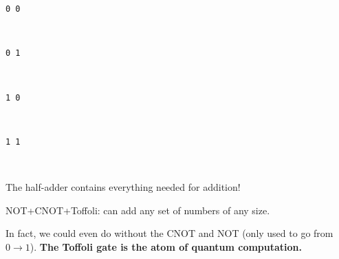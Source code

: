 \documentclass[11pt]{article}
\begin{document}
    \begin{Verbatim}[commandchars=\\\{\}]
0 0
    \end{Verbatim}

    \begin{center}
    \end{center}
    { \hspace*{\fill} \\}
    
    \begin{Verbatim}[commandchars=\\\{\}]
0 1
    \end{Verbatim}

    \begin{center}
    \end{center}
    { \hspace*{\fill} \\}
    
    \begin{Verbatim}[commandchars=\\\{\}]
1 0
    \end{Verbatim}

    \begin{center}
    \end{center}
    { \hspace*{\fill} \\}
    
    \begin{Verbatim}[commandchars=\\\{\}]
1 1
    \end{Verbatim}

    \begin{center}
    \end{center}
    { \hspace*{\fill} \\}
    
    The half-adder contains everything needed for addition!

NOT+CNOT+Toffoli: can add any set of numbers of any size.

In fact, we could even do without the CNOT and NOT (only used to go from
\(0 \rightarrow 1\)). \textbf{The Toffoli gate is the atom of quantum
computation.}
\end{document}
